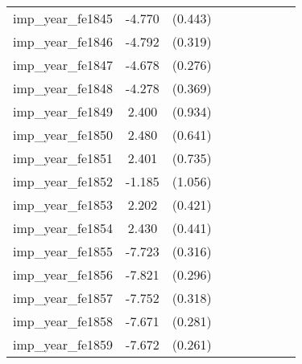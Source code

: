 {\begin{tabular}{l*{4}{cc}}
imp\_year\_fe1845&   -4.770\sym{***}&  (0.443)&                  &         &                  &         &                  &         \\
imp\_year\_fe1846&   -4.792\sym{***}&  (0.319)&                  &         &                  &         &                  &         \\
imp\_year\_fe1847&   -4.678\sym{***}&  (0.276)&                  &         &                  &         &                  &         \\
imp\_year\_fe1848&   -4.278\sym{***}&  (0.369)&                  &         &                  &         &                  &         \\
imp\_year\_fe1849&    2.400\sym{*}  &  (0.934)&                  &         &                  &         &                  &         \\
imp\_year\_fe1850&    2.480\sym{***}&  (0.641)&                  &         &                  &         &                  &         \\
imp\_year\_fe1851&    2.401\sym{**} &  (0.735)&                  &         &                  &         &                  &         \\
imp\_year\_fe1852&   -1.185         &  (1.056)&                  &         &                  &         &                  &         \\
imp\_year\_fe1853&    2.202\sym{***}&  (0.421)&                  &         &                  &         &                  &         \\
imp\_year\_fe1854&    2.430\sym{***}&  (0.441)&                  &         &                  &         &                  &         \\
imp\_year\_fe1855&   -7.723\sym{***}&  (0.316)&                  &         &                  &         &                  &         \\
imp\_year\_fe1856&   -7.821\sym{***}&  (0.296)&                  &         &                  &         &                  &         \\
imp\_year\_fe1857&   -7.752\sym{***}&  (0.318)&                  &         &                  &         &                  &         \\
imp\_year\_fe1858&   -7.671\sym{***}&  (0.281)&                  &         &                  &         &                  &         \\
imp\_year\_fe1859&   -7.672\sym{***}&  (0.261)&                  &         &                  &         &                  &         \\

\end{tabular}}
